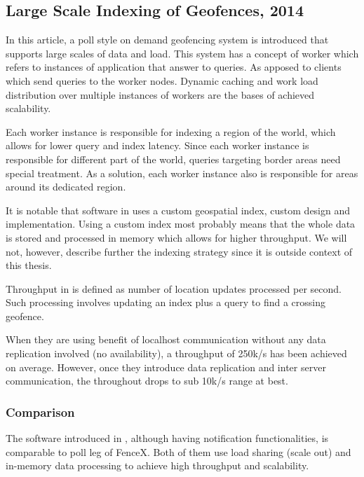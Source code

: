 \documentclass[a4]{report}
\begin{document}
    \subsection{Large Scale Indexing of Geofences, 2014 \cite{Cirillo_Jacobs_Martin_Szczytowski_2014}}
    In this article, a poll style on demand geofencing system is introduced that supports large scales
    of data and load.
    This system has a concept of worker which refers to instances of application that answer to queries.
    As apposed to clients which send queries to the worker nodes.
    Dynamic caching and work load distribution over multiple instances of workers are the bases of achieved
    scalability.

    Each worker instance is responsible for indexing a region of the world, which allows for lower query and index latency.
    Since each worker instance is responsible for different part of the world, queries targeting border areas need
    special treatment.
    As a solution, each worker instance also is responsible for areas around its dedicated region.

    It is notable that software in \cite{Cirillo_Jacobs_Martin_Szczytowski_2014} uses a custom geospatial index,
    custom design and implementation.
    Using a custom index most probably means that the whole data is stored and processed in memory which allows for higher throughput.
    We will not, however, describe further the indexing strategy since it is outside context of this thesis.

    Throughput in \cite{Cirillo_Jacobs_Martin_Szczytowski_2014} is defined as number of location updates processed per second.
    Such processing involves updating an index plus a query to find a crossing geofence.

    When they are using benefit of localhost communication without any data replication involved (no availability), a
    throughput of 250k/s has been achieved on average.
    However, once they introduce data replication and inter server communication, the throughout drops to sub 10k/s
    range at best.

    \subsubsection{Comparison}
    The software introduced in \cite{Cirillo_Jacobs_Martin_Szczytowski_2014}, although having notification
    functionalities, is comparable to poll leg of FenceX.
    Both of them use load sharing (scale out) and in-memory data processing to achieve high throughput and
    scalability.
\end{document}
